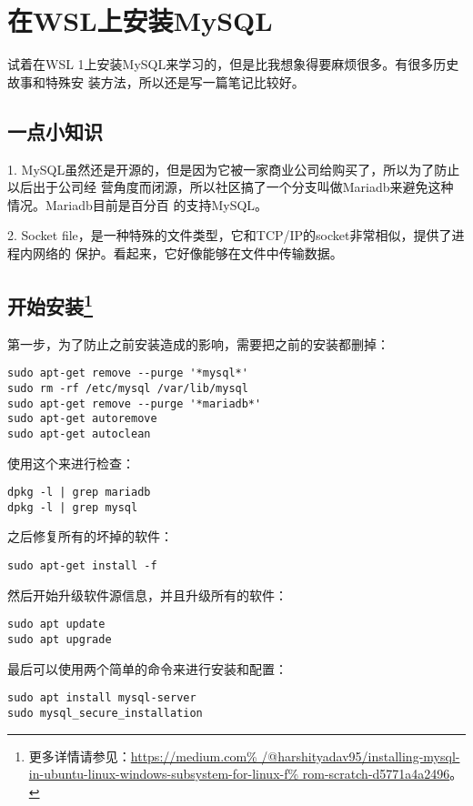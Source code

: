 
\section{在WSL上安装MySQL}

试着在WSL 1上安装MySQL来学习的，但是比我想象得要麻烦很多。有很多历史故事和特殊安
装方法，所以还是写一篇笔记比较好。

\subsection{一点小知识}

1.
MySQL虽然还是开源的，但是因为它被一家商业公司给购买了，所以为了防止以后出于公司经
营角度而闭源，所以社区搞了一个分支叫做Mariadb来避免这种情况。Mariadb目前是百分百
的支持MySQL。

2.
Socket file，是一种特殊的文件类型，它和TCP/IP的socket非常相似，提供了进程内网络的
保护。看起来，它好像能够在文件中传输数据。

\subsection[开始安装]{开始安装\footnote{更多详情请参见：\url{https://medium.com%
/@harshityadav95/installing-mysql-in-ubuntu-linux-windows-subsystem-for-linux-f%
rom-scratch-d5771a4a2496}。}}

第一步，为了防止之前安装造成的影响，需要把之前的安装都删掉：
\begin{lstlisting}
sudo apt-get remove --purge '*mysql*'
sudo rm -rf /etc/mysql /var/lib/mysql
sudo apt-get remove --purge '*mariadb*'
sudo apt-get autoremove
sudo apt-get autoclean
\end{lstlisting}

使用这个来进行检查：
\begin{lstlisting}
dpkg -l | grep mariadb
dpkg -l | grep mysql
\end{lstlisting}

之后修复所有的坏掉的软件：
\begin{lstlisting}
sudo apt-get install -f
\end{lstlisting}

然后开始升级软件源信息，并且升级所有的软件：
\begin{lstlisting}
sudo apt update
sudo apt upgrade
\end{lstlisting}

最后可以使用两个简单的命令来进行安装和配置：
\begin{lstlisting}
sudo apt install mysql-server
sudo mysql_secure_installation
\end{lstlisting}

